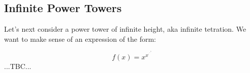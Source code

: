 



\begin{comment}

To solve it, use the Sage code:

a = 3
b = 2
k = a + b^2/2
s = sqrt(k^2 - a^2)
x1 = k + s
x2 = k - s
y1 = a + b * sqrt(x1)
y2 = a + b * sqrt(x2)
N(x1),N(y1), N(x2),N(y2)

which gives:

(9.00000000000000, 9.00000000000000, 1.00000000000000, 5.00000000000000)


Check the formula against Mathematica's result:

https://www.wolframalpha.com/input?i=solve+x+%

Here is a plot of  f(x) = x  and  f(x) = a + b sqrt(x)  with adjustable a,b:
  https://www.desmos.com/calculator/epu6yonem9
The intersection of the graphs should be our solution

\end{comment}




\subsection{Infinite Power Towers}
Let's next consider a power tower of infinite height, aka infinite tetration. We want to make sense of an expression of the form:

\begin{equation}
f(x) = x^{x^{\cdot^{\cdot^{\cdot^x}}}}
\end{equation}
...TBC...


